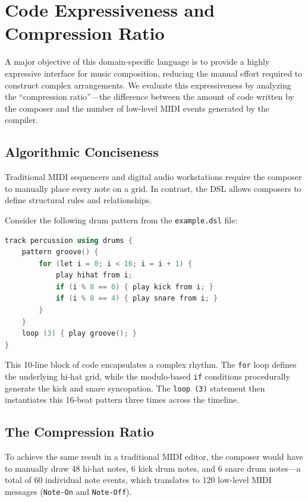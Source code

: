 \section{Code Expressiveness and Compression Ratio}\label{sec:evaluation-expressiveness}

A major objective of this domain-specific language is to provide a highly expressive interface for music composition,
reducing the manual effort required to construct complex arrangements.
We evaluate this expressiveness by analyzing the ``compression ratio''—the difference between the amount of code written
by the composer and the number of low-level MIDI events generated by the compiler.

\subsection{Algorithmic Conciseness}\label{subsec:algorithmic-conciseness}

Traditional MIDI sequencers and digital audio workstations require the composer to manually place every note on a grid.
In contrast, the DSL allows composers to define structural rules and relationships.

Consider the following drum pattern from the \texttt{example.dsl} file:
\begin{lstlisting}[language=C++, caption={A generative drum pattern using control flow.},label={lst:lstlisting4}]
track percussion using drums {
    pattern groove() {
        for (let i = 0; i < 16; i = i + 1) {
            play hihat from i;
            if (i % 8 == 0) { play kick from i; }
            if (i % 8 == 4) { play snare from i; }
        }
    }
    loop (3) { play groove(); }
}
\end{lstlisting}

This 10-line block of code encapsulates a complex rhythm.
The \texttt{for} loop defines the underlying hi-hat grid, while the modulo-based \texttt{if} conditions procedurally
generate the kick and snare syncopation.
The \texttt{loop (3)} statement then instantiates this 16-beat pattern three times across the timeline.

\subsection{The Compression Ratio}\label{subsec:the-compression-ratio}

To achieve the same result in a traditional MIDI editor, the composer would have to manually draw 48 hi-hat notes, 6
kick drum notes, and 6 snare drum notes—a total of 60 individual note events, which translates to 120 low-level MIDI
messages (\texttt{Note-On} and \texttt{Note-Off}).

